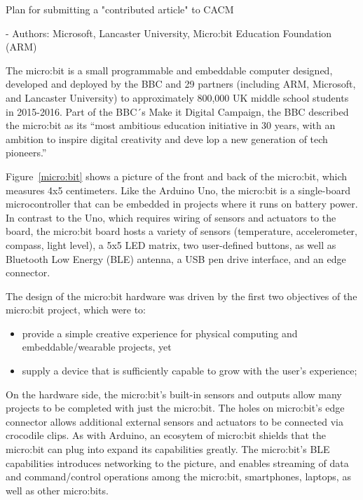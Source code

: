 Plan for submitting a "contributed article" to CACM

- Authors: Microsoft, Lancaster University, Micro:bit Education Foundation (ARM)


The micro:bit is a small programmable and embeddable computer designed, 
developed and deployed by the BBC and 29 partners (including ARM, Microsoft, 
and Lancaster University) to approximately 800,000 UK middle school students
in 2015-2016. Part of the BBC´s Make it Digital Campaign, the BBC described the
micro:bit as its ``most ambitious education initiative in 30 years, 
with an ambition to inspire digital creativity and 
deve lop a new generation of tech pioneers.''~\cite{BBCwebsite}


Figure~\ref{micro:bit} shows a picture of the front and back of the
micro:bit, which measures 4x5 centimeters. Like the Arduino Uno,
the micro:bit is a single-board microcontroller that can be embedded
in projects where it runs on battery power.
In contrast to the Uno, which requires wiring of sensors and actuators
to the board, the micro:bit board hosts a variety of
sensors (temperature, accelerometer, compass, light level), a
5x5 LED matrix, two user-defined buttons, as well as Bluetooth
Low Energy (BLE) antenna, a USB pen drive interface, and an edge connector.

The design of the micro:bit hardware was driven by the
first two objectives of the micro:bit project, which were to:
\begin{itemize}
\item provide a simple creative experience for physical computing and embeddable/wearable projects, yet
\item supply a device that is sufficiently capable to grow with the user’s experience; 
\end{itemize}

On the hardware side, the micro:bit's built-in sensors and outputs allow many projects to 
be completed with just the micro:bit. The holes on micro:bit's edge
connector allows additional external sensors and actuators to be connected via crocodile clips.
As with Arduino, an ecosytem of micro:bit shields that the micro:bit can plug into expand
its capabilities greatly. The micro:bit's BLE capabilities introduces networking to the
picture, and enables streaming of data and command/control operations among the micro:bit, 
smartphones, laptops, as well as other micro:bits.

